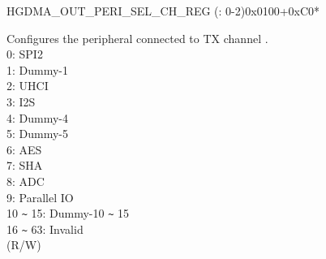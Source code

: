 \begin{register}{H}{GDMA\_OUT\_PERI\_SEL\_CH\_REG (: 0-2)}{0x0100+0xC0*}\label{regdesc:GDMAOUTPERISELCHNREG}
%
%
\regnewline%
\begin{regdesc}\begin{reglist}
\label{fielddesc:GDMAPERIOUTSELCHN}\item [GDMA\_PERI\_OUT\_SEL\_CH\regindex{n}] Configures the peripheral connected to TX channel .\\
0: SPI2\\
1: Dummy-1\\
2: UHCI\\
3: I2S\\
4: Dummy-4\\
5: Dummy-5\\
6: AES\\
7: SHA\\
8: ADC\\
9: Parallel IO\\
10 \verb+~+  15: Dummy-10  \verb+~+  15\\
16 \verb+~+ 63: Invalid\\
(R/W)
\end{reglist}\end{regdesc}
\end{register}
